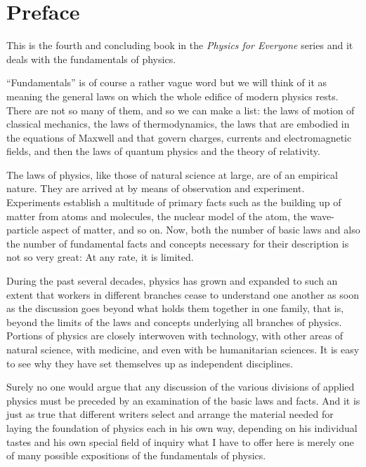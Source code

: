 

\chapter{Preface} 
This is the fourth and concluding book in the \emph{Physics for Everyone} series and it deals with the fundamentals of physics.

``Fundamentals'' is of course a rather vague word but we will think of it as meaning the general laws on which the whole edifice of modern physics rests. There are not so many of them, and so we can make a list: the laws of motion of classical mechanics, the laws of thermody­namics, the laws that are embodied in the equations of Maxwell and that govern charges, currents and electro­magnetic fields, and then the laws of quantum physics and the theory of relativity.

The laws of physics, like those of natural science at large, are of an empirical nature. They are arrived at by means of observation and experiment. Experiments establish a multitude of primary facts such as the build­ing up of matter from atoms and molecules, the nuclear model of the atom, the wave-particle aspect of matter, and so on. Now, both the number of basic laws and also the number of fundamental facts and concepts necessary for their description is not so very great: At any rate, it is limited.

During the past several decades, physics has grown and expanded to such an extent that workers in different branches cease to understand one another as soon as the discussion goes beyond what holds them together in one family, that is, beyond the limits of the laws and concepts underlying all branches of physics. Portions of physics are closely interwoven with technology, with other areas of natural science, with medicine, and even with be humanitarian sciences. It is easy to see why they
have set themselves up as independent disciplines. 

Surely no one would argue that any discussion of the various divisions of applied physics must be preceded by an examination of the basic laws and facts. And it is just as true that different writers select and arrange the material needed for laying the foundation of physics each in his own way, depending on his individual tastes and his own special field of inquiry what I have to offer here is merely one of many possible expositions of the fundamentals of physics.

